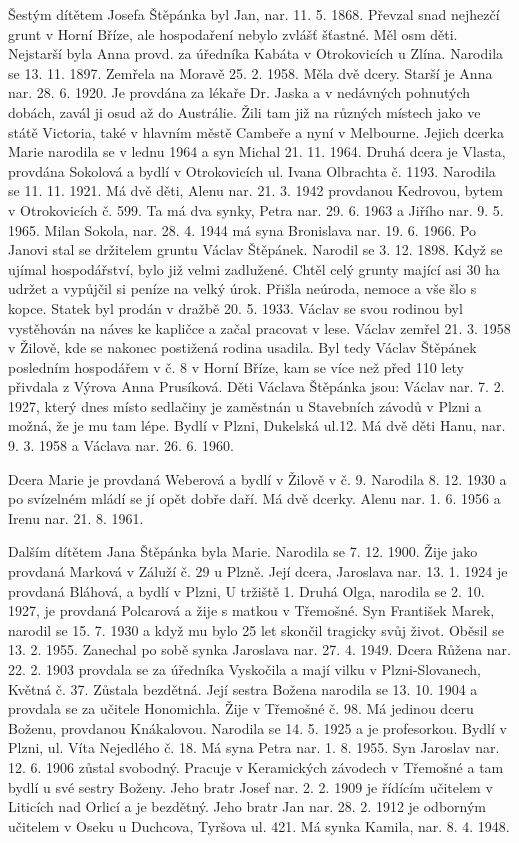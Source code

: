 \documentclass[../dejiny-rodu-prusiku.tex]{subfiles}
\begin{document}
Šestým dítětem Josefa Štěpánka byl Jan, nar. 11. 5. 1868. Převzal snad nejhezčí grunt v Horní Bříze, ale hospodaření nebylo zvlášť šťastné. Měl osm děti. Nejstarší byla Anna provd. za úředníka Kabáta v Otrokovicích u Zlí­na. Narodila se 13. 11. 1897. Zemřela na Moravě 25. 2. 1958. Měla dvě dcery. Starší je Anna nar. 28. 6. 1920. Je provdána za lékaře Dr. Jaska a v nedávných pohnutých dobách, zavál ji osud až do Austrálie. Žili tam již na různých místech jako ve státě Victoria, také v hlavním městě Cambeře a nyní v Melbourne. Jejich dcerka Marie naro­dila se v lednu 1964 a syn Michal 21. 11. 1964. Druhá dce­ra je Vlasta, provdána Sokolová a bydlí v Otrokovicích ul. Ivana Olbrachta č. 1193. Narodila se 11. 11. 1921. Má dvě děti, Alenu nar. 21. 3. 1942 provdanou Kedrovou, bytem v Otrokovicích č. 599. Ta má dva synky, Petra nar. 29. 6. 1963 a Jiřího nar. 9. 5. 1965. Milan Sokola, nar. 28. 4. 1944 má syna Bronislava nar. 19. 6. 1966. Po Janovi stal se držitelem gruntu Václav Štěpánek. Narodil se 3. 12. 1898. Když se ujímal hospodářství, bylo již velmi zadlužené. Chtěl celý grunty mající asi 30 ha udržet a vypůjčil si peníze na velký úrok. Přišla neúroda, nemoce a vše šlo s kopce. Statek byl prodán v draž­bě 20. 5. 1933. Václav se svou rodinou byl vystěhován na náves ke kapličce a začal pracovat v lese. Václav zemřel 21. 3. 1958 v Žilově, kde se nakonec postižená rodina usa­dila. Byl tedy Václav Štěpánek posledním hospodářem v č. 8 v Horní Bříze, kam se více než před 110 lety přivdala z Výrova Anna Prusíková. Děti Václava Štěpánka jsou: Václav nar. 7. 2. 1927, který dnes místo sedlačiny je za­městnán u Stavebních závodů v Plzni a možná, že je mu tam lépe. Bydlí v Plzni, Dukelská ul.12. Má dvě děti Hanu,  nar. 9. 3. 1958 a Václava nar. 26. 6. 1960.

Dcera Marie je provdaná Weberová a bydlí v Žilově v č. 9. Narodila 8. 12. 1930 a po svízelném mládí se jí opět dobře daří. Má dvě dcerky. Alenu nar. 1. 6. 1956 a Irenu nar. 21. 8. 1961.

Dalším dítětem Jana Štěpánka byla Marie. Narodila se 7. 12. 1900. Žije jako provdaná Marková v Záluží č. 29 u Plzně. Její dcera, Jaroslava nar. 13. 1. 1924 je provdaná Bláhová, a bydlí v Plzni, U tržiště 1. Druhá Olga, narodila se 2. 10. 1927, je provdaná Polcarová a žije s matkou v Třemošné. Syn František Marek, narodil se 15. 7. 1930 a když mu bylo 25 let skončil tragicky svůj život. Oběsil se 13. 2. 1955. Zanechal po sobě synka Jaroslava nar. 27. 4. 1949. Dcera Růžena nar. 22. 2. 1903 provdala se za úředníka Vysko­čila a mají vilku v Plzni-Slovanech, Květná č. 37. Zůsta­la bezdětná. Její sestra Božena narodila se 13. 10. 1904 a  provdala se za učitele Honomichla. Žije v Třemošné č. 98. Má jedinou dceru Boženu, provdanou Knákalovou. Narodila se 14. 5. 1925 a je profesorkou. Bydlí v Plzni, ul. Víta Nejedlého č. 18. Má syna Petra nar. 1. 8. 1955. Syn Jaroslav nar. 12. 6. 1906 zůstal svobodný. Pracuje v Keramických závodech v Třemošné a tam bydlí u své sestry Boženy. Jeho bratr Josef nar. 2. 2. 1909 je řídícím učitelem v Liticích nad Orlicí a je bezdětný. Jeho bratr Jan nar. 28. 2. 1912 je odborným učitelem v Oseku u Duchcova, Tyršova ul. 421. Má synka Kamila, nar. 8. 4. 1948.
\end{document}
